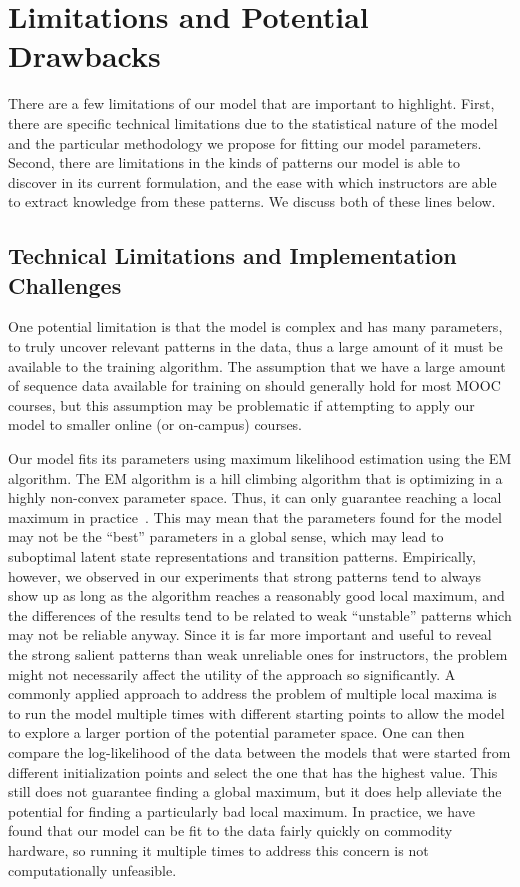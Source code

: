 \section{Limitations and Potential Drawbacks}

There are a few limitations of our model that are important to highlight.
First, there are specific technical limitations due to the statistical
nature of the model and the particular methodology we propose for fitting
our model parameters. Second, there are limitations in the kinds of
patterns our model is able to discover in its current formulation, and the
ease with which instructors are able to extract knowledge from these
patterns. We discuss both of these lines below.

\subsection{Technical Limitations and Implementation Challenges}

One potential limitation is that the model is complex and has many parameters,
to truly uncover relevant patterns in the data, thus a large amount of it must
be available to the training algorithm. The assumption that we have a large
amount of sequence data available for training on should generally hold for
most MOOC courses, but this assumption may be problematic if attempting to
apply our model to smaller online (or on-campus) courses.

Our model fits its parameters using maximum likelihood estimation using the
EM algorithm. The EM algorithm is a hill climbing algorithm that is
optimizing in a highly non-convex parameter space. Thus, it can only
guarantee reaching a local maximum in practice~\citep{Dempster:1977:JRSS}.
This may mean that the parameters found for the model may not be the
``best'' parameters in a global sense, which may lead to suboptimal latent
state representations and transition patterns. Empirically, however, we observed
in our experiments that strong patterns tend to always show up as long as the algorithm reaches a reasonably good local maximum, and the differences of the results tend to be 
related to weak ``unstable'' patterns which may not be reliable anyway. Since
it is far more important and useful to reveal the strong salient patterns than weak unreliable ones for instructors, the problem might not necessarily affect the utility of the approach so significantly.  
 A commonly applied approach
to address the problem of multiple local maxima is to run the model multiple times with different
starting points to allow the model to explore a larger portion of the
potential parameter space. One can then compare the log-likelihood of the
data between the models that were started from different initialization
points and select the one that has the highest value. This still does not
guarantee finding a global maximum, but it does help alleviate the
potential for finding a particularly bad local maximum.  
In practice, we
have found that our model can be fit to the data fairly quickly on
commodity hardware, so running it multiple times to address this concern is
not computationally unfeasible. 


